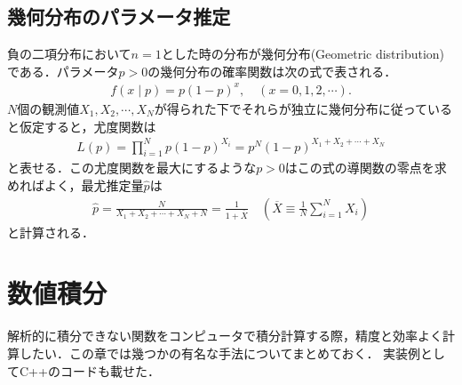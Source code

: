 \documentclass[a4j,papersize,disablejfam,slide,14pt]{jsarticle}
\begin{document}
\subsection{幾何分布のパラメータ推定}
	負の二項分布において$n=1$とした時の分布が幾何分布({\rm Geometric distribution})である．パラメータ$p>0$の幾何分布の確率関数は次の式で表される．
    \begin{align}
    	f(x \mid p) = p (1-p)^x, \quad(x=0,1,2,\cdots).
    \end{align}
    $N$個の観測値$X_1, X_2, \cdots, X_N$が得られた下でそれらが独立に幾何分布に従っていると仮定すると，尤度関数は
    \begin{align}
    	L(p) = \prod_{i=1}^{N} p (1-p)^{X_i} = p^{N} (1-p)^{X_1+X_2+\cdots+X_N}
    \end{align}
    と表せる．この尤度関数を最大にするような$p>0$はこの式の導関数の零点を求めればよく，最尤推定量$\hat{p}$は
    \begin{align}
    	\hat{p} = \frac{N}{X_1+X_2+\cdots+X_N + N} = \frac{1}{1+\overline{X}} \quad \left( \overline{X} \equiv \frac{1}{N}\sum_{i=1}^{N}X_i \right)
    \end{align}
    と計算される．

\section{数値積分}
	解析的に積分できない関数をコンピュータで積分計算する際，精度と効率よく計算したい．この章では幾つかの有名な手法についてまとめておく．
    実装例として{\rm C++}のコードも載せた．
    
\end{document}
